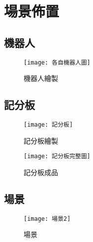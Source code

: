 \chapter{場景佈置}
\section{機器人}
\begin{figure}[hbt!]
\begin{center}
\label{各自機器人圖}
\texttt{[image: 各自機器人圖]}
\caption{\Large 機器人繪製}
\end{center}
\end{figure}
\newpage

\section{記分板}
\begin{figure}[hbt!]
\begin{center}
\label{記分板}
\texttt{[image: 記分板]}
\caption{\Large 記分板繪製}
\end{center}
\end{figure}

\begin{figure}[hbt!]
\begin{center}
\label{記分板完整圖}
\texttt{[image: 記分板完整圖]}
\caption{\Large 記分板成品}
\end{center}
\end{figure}
\newpage

\section{場景}
\begin{figure}[hbt!]
\begin{center}
\label{場景2}
\texttt{[image: 場景2]}
\caption{\Large 場景}
\end{center}
\end{figure}
\newpage
